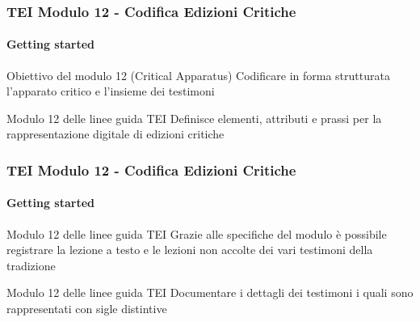\begin{frame}
    \frametitle{TEI Modulo 12 - Codifica Edizioni Critiche}
    \framesubtitle{Getting started}
    \addtocounter{nframe}{1}


    
    \begin{block}{Obiettivo del modulo 12 (Critical Apparatus)}
        Codificare in forma strutturata l'apparato critico e l'insieme dei testimoni
    \end{block}

    \begin{block}{Modulo 12 delle linee guida TEI}
        Definisce elementi, attributi e prassi per la rappresentazione digitale di edizioni critiche
    \end{block}

\end{frame}

\begin{frame}
    \frametitle{TEI Modulo 12 - Codifica Edizioni Critiche}
    \framesubtitle{Getting started}
    \addtocounter{nframe}{1}




    \begin{block}{Modulo 12 delle linee guida TEI}
       Grazie alle specifiche del modulo è possibile registrare la lezione a testo e le lezioni non accolte dei vari testimoni della tradizione
    \end{block}

    \begin{block}{Modulo 12 delle linee guida TEI}
       Documentare i dettagli dei testimoni i quali sono rappresentati con sigle distintive
     \end{block}

\end{frame}

